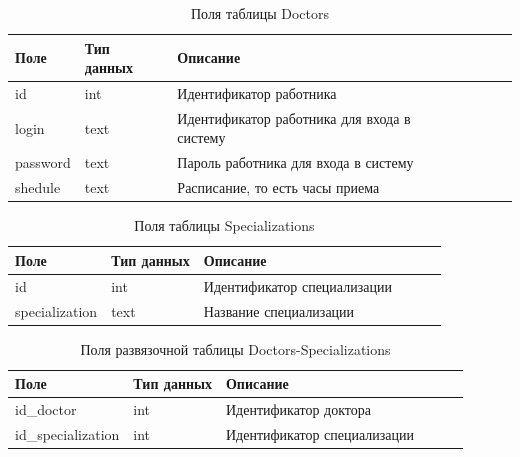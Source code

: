 \begin{table}[hbtp]
	\begin{center}
			\captionsetup{justification=raggedright, singlelinecheck=false}
			\caption{\label{tab:doctors}Поля таблицы Doctors}
		\begin{tabular}{|l|l|l|l|l|l|}
			\hline {Поле} & {Тип данных} & {Описание}  \\ \hline
			id  & int & Идентификатор работника   \\ \hline
			login & text & Идентификатор работника для входа в систему \\ \hline
			password & text & Пароль работника для входа в систему  \\ \hline
			shedule & text & Расписание, то есть часы приема\\ \hline
		\end{tabular}
	\end{center}
\end{table}

\begin{table}[hbtp]
	\begin{center}
		\captionsetup{justification=raggedright, singlelinecheck=false}
		\caption{\label{tab:specializations}Поля таблицы Specializations}
		\begin{tabular}{|l|l|l|l|l|l|}
			\hline {Поле} & {Тип данных} & {Описание}  \\ \hline
			id  & int & Идентификатор специализации \\ \hline
			specialization & text & Название специализации\\ \hline
		\end{tabular}
	\end{center}
\end{table}

\begin{table}[hbtp]
	\begin{center}
		\captionsetup{justification=raggedright, singlelinecheck=false}
		\caption{\label{tab:DC}Поля развязочной таблицы Doctors-Specializations}
		\begin{tabular}{|l|l|l|l|l|l|}
			\hline {Поле} & {Тип данных} & {Описание}  \\ \hline
			id\_doctor  & int & Идентификатор доктора \\ \hline
			id\_specialization & int & Идентификатор специализации \\ \hline
		\end{tabular}
	\end{center}
\end{table}

